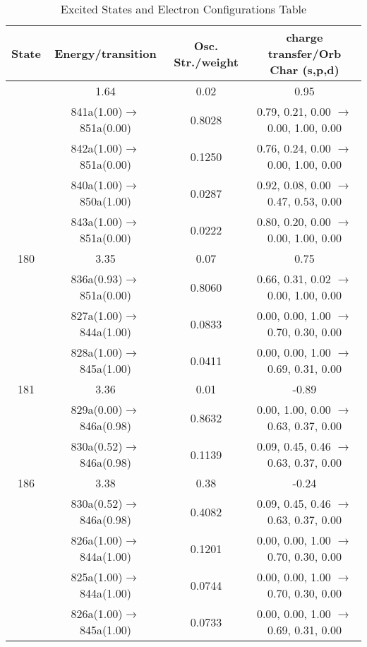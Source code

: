 \documentclass[10pt,a4paper]{article}
\begin{document}
 \centering
 \begin{longtable}{c|c|c|c}
   \caption{Excited States and Electron Configurations Table}
   \hline
     State & Energy/transition & Osc. Str./weight & charge transfer/Orb Char (s,p,d)\\
    \hline 
 
   \endfirsthead 
   \hline
   \endhead
   \hline
   \endfoot
   \endlastfoot 
40 &	 1.64 &	 0.02 &	 0.95 \\ 
  	& 841a(1.00)$\rightarrow$851a(0.00) &	 0.8028 &	 0.79, 0.21, 0.00 $\rightarrow$ 0.00, 1.00, 0.00 \\ 
 	& 842a(1.00)$\rightarrow$851a(0.00) &	 0.1250 &	 0.76, 0.24, 0.00 $\rightarrow$ 0.00, 1.00, 0.00 \\ 
 	& 840a(1.00)$\rightarrow$850a(1.00) &	 0.0287 &	 0.92, 0.08, 0.00 $\rightarrow$ 0.47, 0.53, 0.00 \\ 
 	& 843a(1.00)$\rightarrow$851a(0.00) &	 0.0222 &	 0.80, 0.20, 0.00 $\rightarrow$ 0.00, 1.00, 0.00 \\ 
 \hline180 &	 3.35 &	 0.07 &	 0.75 \\ 
  	& 836a(0.93)$\rightarrow$851a(0.00) &	 0.8060 &	 0.66, 0.31, 0.02 $\rightarrow$ 0.00, 1.00, 0.00 \\ 
 	& 827a(1.00)$\rightarrow$844a(1.00) &	 0.0833 &	 0.00, 0.00, 1.00 $\rightarrow$ 0.70, 0.30, 0.00 \\ 
 	& 828a(1.00)$\rightarrow$845a(1.00) &	 0.0411 &	 0.00, 0.00, 1.00 $\rightarrow$ 0.69, 0.31, 0.00 \\ 
 \hline181 &	 3.36 &	 0.01 &	 -0.89 \\ 
  	& 829a(0.00)$\rightarrow$846a(0.98) &	 0.8632 &	 0.00, 1.00, 0.00 $\rightarrow$ 0.63, 0.37, 0.00 \\ 
 	& 830a(0.52)$\rightarrow$846a(0.98) &	 0.1139 &	 0.09, 0.45, 0.46 $\rightarrow$ 0.63, 0.37, 0.00 \\ 
 \hline186 &	 3.38 &	 0.38 &	 -0.24 \\ 
  	& 830a(0.52)$\rightarrow$846a(0.98) &	 0.4082 &	 0.09, 0.45, 0.46 $\rightarrow$ 0.63, 0.37, 0.00 \\ 
 	& 826a(1.00)$\rightarrow$844a(1.00) &	 0.1201 &	 0.00, 0.00, 1.00 $\rightarrow$ 0.70, 0.30, 0.00 \\ 
 	& 825a(1.00)$\rightarrow$844a(1.00) &	 0.0744 &	 0.00, 0.00, 1.00 $\rightarrow$ 0.70, 0.30, 0.00 \\ 
 	& 826a(1.00)$\rightarrow$845a(1.00) &	 0.0733 &	 0.00, 0.00, 1.00 $\rightarrow$ 0.69, 0.31, 0.00 \\ 

\end{longtable}
\end{document}
